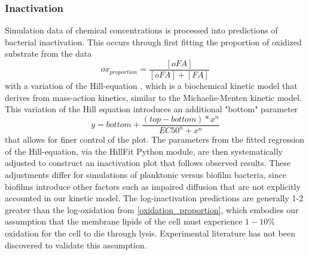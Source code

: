 \subsubsection*{Inactivation}
Simulation data of chemical concentrations is processed into predictions of bacterial inactivation. This occurs through first fitting the proportion of oxidized substrate from the data
\begin{equation} \label{oxidation_proportion}
    ox_{proportion} = \frac{[oFA]}{[oFA]+[FA]}
\end{equation}
with a variation of the Hill-equation \cite{Gesztelyi2012ThePharmacology}, which is a biochemical kinetic model that derives from mass-action kinetics, similar to the Michaelis-Menten kinetic model. This variation of the Hill equation \cite{Inoue2016OscillationActivation} introduces an additional "bottom" parameter 
\begin{equation}
    y=bottom+\frac{(top-bottom)*x^n}{EC50^n+x^n}
\end{equation}
that allows for finer control of the plot. The parameters from the fitted regression of the Hill-equation, via the HillFit Python module, are then systematically adjusted to construct an inactivation plot that follows observed results. These adjustments differ for simulations of planktonic versus biofilm bacteria, since biofilms introduce other factors such as impaired diffusion that are not explicitly accounted in our kinetic model. The log-inactivation predictions are generally 1-2 greater than the log-oxidation from \cref{oxidation_proportion}, which embodies our assumption that the membrane lipids of the cell must experience $1-10\%$ oxidation for the cell to die through lysis. Experimental literature has not been discovered to validate this assumption.



